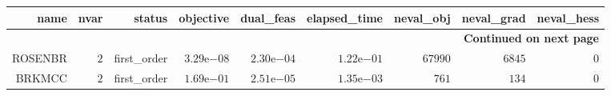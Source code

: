 \begin{longtable}{rrrrrrrrr}
\hline
name & nvar & status & objective & dual\_feas & elapsed\_time & neval\_obj & neval\_grad & neval\_hess \\\hline
\endhead
\hline
\multicolumn{9}{r}{{\bfseries Continued on next page}}\\
\hline
\endfoot
\endlastfoot
ROSENBR & \(     2\) & first\_order & \( 3.29\)e\(-08\) & \( 2.30\)e\(-04\) & \( 1.22\)e\(-01\) & \( 67990\) & \(  6845\) & \(     0\) \\
BRKMCC & \(     2\) & first\_order & \( 1.69\)e\(-01\) & \( 2.51\)e\(-05\) & \( 1.35\)e\(-03\) & \(   761\) & \(   134\) & \(     0\) \\\hline
\end{longtable}

